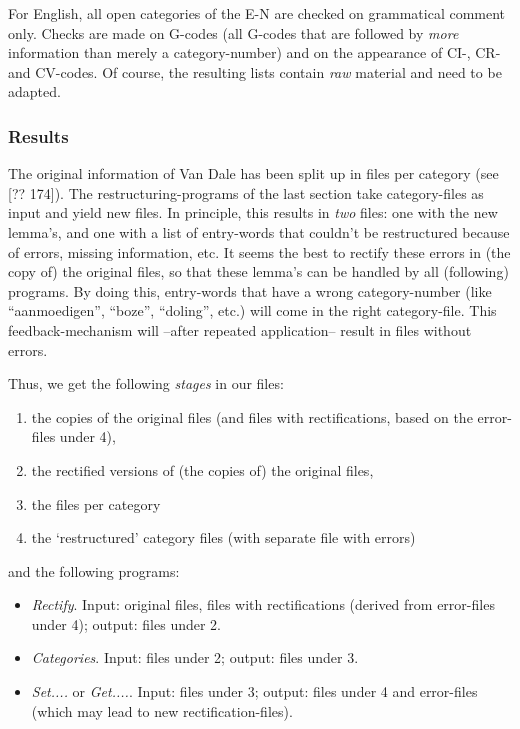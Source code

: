 For English, all open categories of the E-N are checked on grammatical 
comment only. Checks are made on G-codes (all G-codes that are followed by 
{\em more} information than merely a category-number) and on the appearance of 
CI-, CR- and CV-codes. Of course, the resulting lists contain {\em raw} 
material and need to be adapted.

\subsubsection{Results}

The original information of Van Dale has been split up in files per category
(see [?? 174]). 
The restructuring-programs of the last section take category-files as input
and yield new files. In principle, this results in 
{\em two} files: one with the new lemma's, and one with
a list of entry-words that couldn't be restructured because of errors, missing
information, etc. 
It seems the best to rectify these errors in (the copy of) the original files,
so that these lemma's can be handled by all (following) programs. By doing 
this, entry-words that have a wrong category-number (like ``aanmoedigen'', 
``boze'', ``doling'', etc.) will come in the right category-file. This 
feedback-mechanism will --after repeated application-- result in files 
without errors.

Thus, we get the following {\em stages} in our files:
\begin{enumerate}
  \item the copies of the original files (and files with rectifications,
        based on the error-files under 4),
  \item the rectified versions of (the copies of) the original files,
  \item the files per category
  \item the `restructured' category files (with separate file with errors)
\end{enumerate}

and the following programs:
\begin{itemize}
  \item {\em Rectify}. Input: original files, files with rectifications 
        (derived from error-files under 4); output: files under 2.
  \item {\em Categories}. Input: files under 2; output: files under 3.
  \item {\em Set....} or {\em Get....}. Input: files under 3; output: 
        files under 4 and error-files (which may lead to new 
        rectification-files).
\end{itemize}


